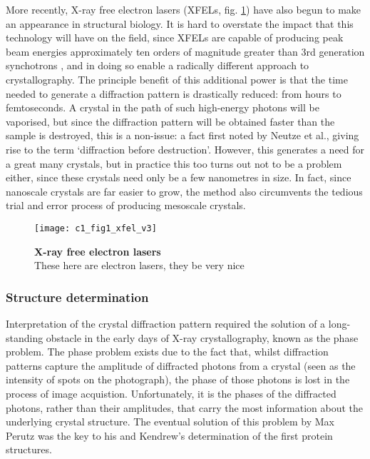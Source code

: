 \documentclass[a4paper,11pt,twoside,openright]{scrbook}
\begin{document}
More recently, X-ray free electron lasers (XFELs, fig. \ref{c1fig1}) have also begun to make an appearance in structural biology. It is hard to overstate the impact that this technology will have on the field, since XFELs are capable of producing peak beam energies approximately ten orders of magnitude greater than 3rd generation synchotrons \cite{Shi2014}, and in doing so enable a radically different approach to crystallography. The principle benefit of this additional power is that the time needed to generate a diffraction pattern is drastically reduced: from hours to femtoseconds. A crystal in the path of such high-energy photons will be vaporised, but since the diffraction pattern will be obtained faster than the sample is destroyed, this is a non-issue: a fact first noted by Neutze et al.\cite{Neutze2000}, giving rise to the term `diffraction before destruction'. However, this generates a need for a great many crystals, but in practice this too turns out not to be a problem either, since these crystals need only be a few nanometres in size. In fact, since nanoscale crystals are far easier to grow, the method also circumvents the tedious trial and error process of producing mesoscale crystals.

\begin{figure}[h]
    \texttt{[image: c1\_fig1\_xfel\_v3]}
    \caption[X-ray free electron lasers]{\sffamily \textbf{X-ray free electron lasers} \\ \rmfamily These here are electron lasers, they be very nice}
    \label{c1fig1}
\end{figure}

\subsubsection{Structure determination}

Interpretation of the crystal diffraction pattern required the solution of a long-standing obstacle in the early days of X-ray crystallography, known as the phase problem. The phase problem exists due to the fact that, whilst diffraction patterns capture the amplitude of diffracted photons from a crystal (seen as the intensity of spots on the photograph), the phase of those photons is lost in the process of image acquistion. Unfortunately, it is the phases of the diffracted photons, rather than their amplitudes, that carry the most information about the underlying crystal structure. The eventual solution of this problem by Max Perutz was the key to his and Kendrew's determination of the first protein structures.
\end{document}
